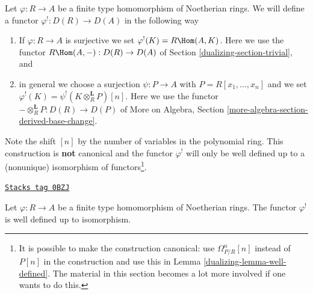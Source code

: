 \medskip\noindent
Let $\varphi : R \to A$ be a finite type homomorphism of Noetherian rings.
We will define a functor $\varphi^! : D(R) \to D(A)$ in the following way
\begin{enumerate}
\item If $\varphi : R \to A$ is surjective we set
$\varphi^!(K) = R\Hom(A, K)$. Here we use the functor
$R\Hom(A, -) : D(R) \to D(A)$ of
Section \ref{dualizing-section-trivial}, and
\item in general we choose a surjection $\psi : P \to A$ with
$P = R[x_1, \ldots, x_n]$ and we set
$\varphi^!(K) = \psi^!(K \otimes_R^\mathbf{L} P)[n]$.
Here we use the functor
$- \otimes_R^\mathbf{L} P : D(R) \to D(P)$
of More on Algebra, Section \ref{more-algebra-section-derived-base-change}.
\end{enumerate}
Note the shift $[n]$ by the number of variables in the polynomial
ring. This construction is {\bf not} canonical and the functor
$\varphi^!$ will only be well defined up to a (nonunique) isomorphism of
functors\footnote{It is possible to make the construction canonical:
use $\Omega^n_{P/R}[n]$ instead of $P[n]$ in the
construction and use this in Lemma \ref{dualizing-lemma-well-defined}.
The material in this section becomes a lot more involved
if one wants to do this.}.

\begin{lemma}
\label{dualizing-lemma-well-defined}
\href{https://stacks.math.columbia.edu/tag/0BZJ}{\texttt{Stacks tag 0BZJ}}

Let $\varphi : R \to A$ be a finite type homomorphism of
Noetherian rings. The functor $\varphi^!$ is well defined
up to isomorphism.
\end{lemma}

